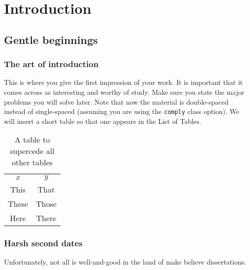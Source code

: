 \chapter{Introduction}
\label{cha:introduction}

\section{Gentle beginnings}

\subsection{The art of introduction}

This is where you give the first  impression of your work. 
It is important that it comes across as interesting and worthy of study. 
Make sure you state the major problems you will solve later.
Note that now the material is double-spaced instead of single-spaced (assuming you are using the \verb+comply+ class option).
We will insert a short table so that one appears in the List of Tables.

\begin{table}[h]
  \centering
  \begin{tabular}{c|c}
    $x$ & $y$ \\
    This & That \\
    These & Those \\
    Here & There \\
  \end{tabular}
  \caption{A table to supercede all other tables}
  \label{tab:supercession}
\end{table}

\newpage

\subsection{Harsh second dates}

Unfortunately, not all is well-and-good in the land of make believe \glspl{dissertation}.



